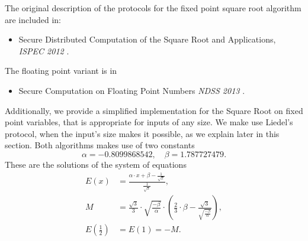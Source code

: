 The original description of the protocols for the fixed point square root algorithm are included in:
\begin{itemize}
\item Secure Distributed Computation of the Square Root and Applications, {\em ISPEC 2012}
\cite{Liedel12}.
\end{itemize}
The floating point variant is in
\begin{itemize}
\item Secure Computation on Floating Point Numbers {\em NDSS 2013} \cite{ABZS13}.
\end{itemize}
Additionally, we provide a simplified implementation for the Square Root on fixed point variables, that is appropriate for inputs of any size. We make use Liedel's protocol, when the input's size makes it possible, as we explain later in this section.
Both algorithms makes use of two constants
\[ \alpha = -0.8099868542, \quad \beta  =  1.787727479.  \]
These are the solutions of the system of equations
\begin{align*}
   E(x)&= \frac{\alpha \cdot x+\beta-\frac{1}{\sqrt{x}}}{\frac{1}{\sqrt{x}}}, \\
	M &= \frac{\sqrt{3}}{3} \cdot \sqrt{\frac{-\beta}{\alpha}}
	    \cdot \left(\frac{2}{3} \cdot\beta
		    -\frac{\sqrt{3}}{\sqrt{\frac{-\beta}{\alpha}}} 
	    \right), \\
   E\left( \frac{1}{2}\right) &= E(1) = -M.
\end{align*}

